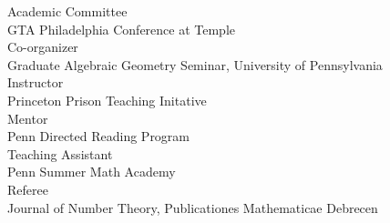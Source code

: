 \documentclass{article}
\begin{document}
Academic Committee\marginpar[\raggedleft{2024}]{}\\
GTA Philadelphia Conference at Temple\\

Co-organizer\marginpar[\raggedleft{2022 - 2024}]{}\\
Graduate Algebraic Geometry Seminar, University of Pennsylvania\\
	
Instructor\marginpar[\raggedleft{2021}]{}\\
Princeton Prison Teaching Initative\\
	
Mentor\marginpar[\raggedleft{2021 - 2024}]{}\\
Penn Directed Reading Program\\
	
Teaching Assistant\marginpar[\raggedleft{2020, 2022}]{}\\
Penn Summer Math Academy\\
	
Referee\marginpar[\raggedleft{2018 - 2020}]{}\\
Journal of Number Theory, Publicationes Mathematicae Debrecen
	
\end{document}
